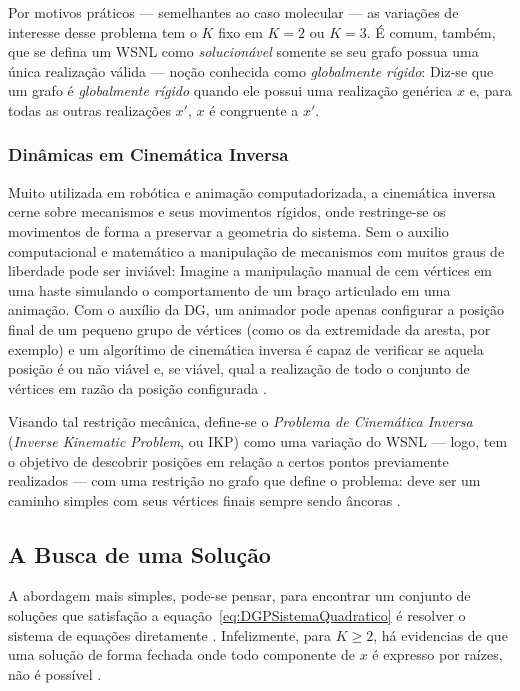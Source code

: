 Por motivos práticos --- semelhantes ao caso molecular --- as variações de interesse desse problema tem o $K$ fixo em $K= 2$ ou $K=3$. É comum, também, que se defina um WSNL como \textit{solucionável} somente se seu grafo possua uma única realização válida \cite{libertiEDG} --- noção conhecida como \textit{globalmente rígido}: Diz-se que um grafo é \textit{globalmente rígido} quando ele possui uma realização genérica $x$ e, para todas as outras realizações $x'$, $x$ é congruente a $x'$. 

\subsubsection{Dinâmicas em Cinemática Inversa}

Muito utilizada em robótica e animação computadorizada, a cinemática inversa cerne sobre mecanismos e seus movimentos rígidos, onde restringe-se os movimentos de forma a preservar a geometria do sistema. Sem o auxilio computacional e matemático a manipulação de mecanismos com muitos graus de liberdade  pode ser inviável: Imagine a manipulação manual de cem vértices em uma haste simulando o comportamento de um braço articulado em uma animação. Com o auxílio da DG, um animador pode apenas configurar a posição final de um pequeno grupo de vértices (como os da extremidade da aresta, por exemplo) e um algorítimo de cinemática inversa é capaz de verificar se aquela posição é ou não viável e, se viável, qual a realização de todo o conjunto de vértices em razão da posição configurada \cite{cinematicaInversa}.

Visando tal restrição mecânica, define-se o \textit{Problema de Cinemática Inversa} (\textit{Inverse Kinematic Problem}, ou IKP) como uma variação do WSNL --- logo, tem o objetivo de descobrir posições em relação a certos pontos previamente realizados --- com uma restrição no grafo que define o problema: deve ser um caminho simples com seus vértices finais sempre sendo âncoras \cite{carlileGDandAplications}.

\subsection{A Busca de uma Solução}

A abordagem mais simples, pode-se pensar, para encontrar um conjunto de soluções que satisfação a equação~\ref{eq:DGPSistemaQuadratico} é resolver o sistema de equações diretamente \cite{carlileBook31Coloquio}. Infelizmente, para $K \geq 2$, há evidencias de que uma solução de forma fechada onde todo componente de $x$ é expresso por raízes, não é possível \cite{libertiEDG}. 

